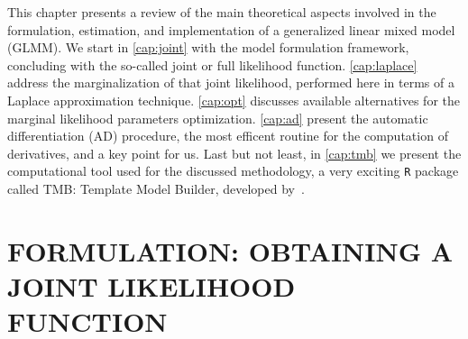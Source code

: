 This chapter presents a review of the main theoretical aspects involved
in the formulation, estimation, and implementation of a generalized
linear mixed model (GLMM). We start in \autoref{cap:joint} with the
model formulation framework, concluding with the so-called joint or full
likelihood function. \autoref{cap:laplace} address the marginalization
of that joint likelihood, performed here in terms of a Laplace
approximation technique. \autoref{cap:opt} discusses available
alternatives for the marginal likelihood parameters optimization.
\autoref{cap:ad} present the automatic differentiation (AD) procedure,
the most efficent routine for the computation of derivatives, and a key
point for us. Last but not least, in \autoref{cap:tmb} we present the
computational tool used for the discussed methodology, a very
exciting \texttt{R} \cite{R21} package called TMB: Template Model
Builder, developed by~.

\section{FORMULATION: OBTAINING A JOINT LIKELIHOOD FUNCTION}
\label{cap:joint}


